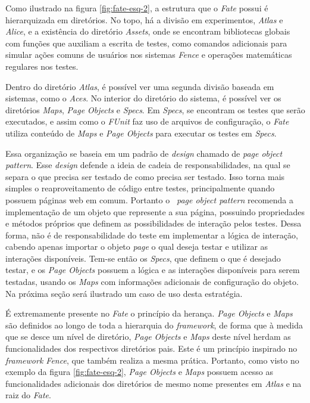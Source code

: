 Como ilustrado na figura \ref{fig:fate-esq-2}, a estrutura que o \emph{Fate} possui é hierarquizada em diretórios. No topo, há a divisão em experimentos, \emph{Atlas} e \emph{Alice}, e a existência do diretório \emph{Assets}, onde se encontram bibliotecas globais com funções que auxiliam a escrita de testes, como comandos adicionais para simular ações comuns de usuários nos sistemas \emph{Fence} e operações matemáticas regulares nos testes.

Dentro do diretório \emph{Atlas}, é possível ver uma segunda divisão baseada em sistemas, como o \emph{Aces}. No interior do diretório do sistema, é possível ver os diretórios \emph{Maps}, \emph{Page Objects} e \emph{Specs}. Em \emph{Specs}, se encontram os testes que serão executados, e assim como o \emph{FUnit} faz uso de arquivos de configuração, o \emph{Fate} utiliza conteúdo de \emph{Maps} e \emph{Page Objects} para executar os testes em \emph{Specs}.

Essa organização se baseia em um padrão de \emph{design} chamado de \emph{page object pattern}. Esse \emph{design} defende a ideia de cadeia de responsabilidades, na qual se separa o que precisa ser testado de como precisa ser testado. Isso torna mais simples o reaproveitamento de código entre testes, principalmente quando possuem páginas web em comum. Portanto o \emph{~page object pattern} recomenda a implementação de um objeto que represente a sua página, possuindo propriedades e métodos próprios que definem as possibilidades de interação pelos testes. Dessa forma, não é de responsabilidade do teste em implementar a lógica de interação, cabendo apenas importar o objeto \emph{page} o qual deseja testar e utilizar as interações disponíveis. Tem-se então os \emph{Specs}, que definem o que é desejado testar, e os \emph{Page Objects} possuem a lógica e as interações disponíveis para serem testadas, usando os \emph{Maps} com informações adicionais de configuração do objeto. Na próxima seção será ilustrado um caso de uso desta estratégia.

É extremamente presente no \emph{Fate} o princípio da herança. \emph{Page Objects} e \emph{Maps} são definidos ao longo de toda a hierarquia do \emph{framework}, de forma que à medida que se desce um nível de diretório, \emph{Page Objects} e \emph{Maps} deste nível herdam as funcionalidades dos respectivos diretórios pais. Este é um princípio inspirado no \emph{framework Fence}, que também realiza a mesma prática. Portanto, como visto no exemplo da figura \ref{fig:fate-esq-2}, \emph{Page Objects} e \emph{Maps} possuem acesso as funcionalidades adicionais dos diretórios de mesmo nome presentes em \emph{Atlas} e na raiz do \emph{Fate}.

